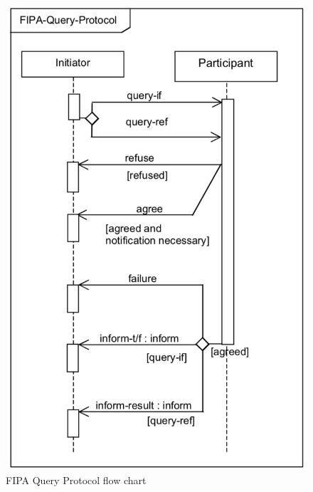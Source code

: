 \begin{figure}\centering
	\includegraphics[width=0.5\linewidth]{_appendices/_a2/fig/fipa-query}
	\caption{FIPA Query Protocol flow chart}
	\label{appx-b:fig:fipa-query}
\end{figure}